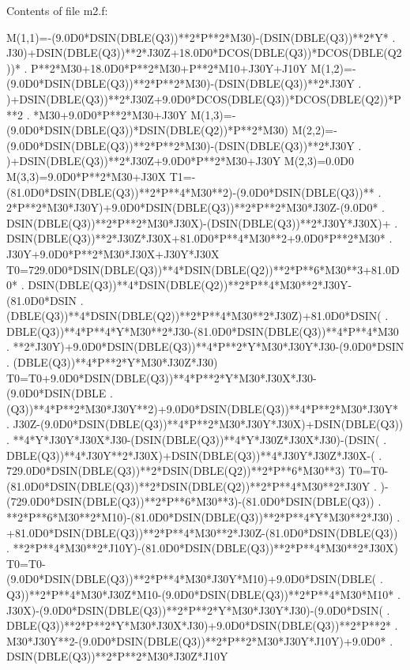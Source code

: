 Contents of file m2.f:
\begin{framedverbatim}
      M(1,1)=-(9.0D0*DSIN(DBLE(Q3))**2*P**2*M30)-(DSIN(DBLE(Q3))**2*Y*
     . J30)+DSIN(DBLE(Q3))**2*J30Z+18.0D0*DCOS(DBLE(Q3))*DCOS(DBLE(Q2))*
     . P**2*M30+18.0D0*P**2*M30+P**2*M10+J30Y+J10Y
      M(1,2)=-(9.0D0*DSIN(DBLE(Q3))**2*P**2*M30)-(DSIN(DBLE(Q3))**2*J30Y
     . )+DSIN(DBLE(Q3))**2*J30Z+9.0D0*DCOS(DBLE(Q3))*DCOS(DBLE(Q2))*P**2
     . *M30+9.0D0*P**2*M30+J30Y
      M(1,3)=-(9.0D0*DSIN(DBLE(Q3))*DSIN(DBLE(Q2))*P**2*M30)
      M(2,2)=-(9.0D0*DSIN(DBLE(Q3))**2*P**2*M30)-(DSIN(DBLE(Q3))**2*J30Y
     . )+DSIN(DBLE(Q3))**2*J30Z+9.0D0*P**2*M30+J30Y
      M(2,3)=0.0D0
      M(3,3)=9.0D0*P**2*M30+J30X
      T1=-(81.0D0*DSIN(DBLE(Q3))**2*P**4*M30**2)-(9.0D0*DSIN(DBLE(Q3))**
     . 2*P**2*M30*J30Y)+9.0D0*DSIN(DBLE(Q3))**2*P**2*M30*J30Z-(9.0D0*
     . DSIN(DBLE(Q3))**2*P**2*M30*J30X)-(DSIN(DBLE(Q3))**2*J30Y*J30X)+
     . DSIN(DBLE(Q3))**2*J30Z*J30X+81.0D0*P**4*M30**2+9.0D0*P**2*M30*
     . J30Y+9.0D0*P**2*M30*J30X+J30Y*J30X
      T0=729.0D0*DSIN(DBLE(Q3))**4*DSIN(DBLE(Q2))**2*P**6*M30**3+81.0D0*
     . DSIN(DBLE(Q3))**4*DSIN(DBLE(Q2))**2*P**4*M30**2*J30Y-(81.0D0*DSIN
     . (DBLE(Q3))**4*DSIN(DBLE(Q2))**2*P**4*M30**2*J30Z)+81.0D0*DSIN(
     . DBLE(Q3))**4*P**4*Y*M30**2*J30-(81.0D0*DSIN(DBLE(Q3))**4*P**4*M30
     . **2*J30Y)+9.0D0*DSIN(DBLE(Q3))**4*P**2*Y*M30*J30Y*J30-(9.0D0*DSIN
     . (DBLE(Q3))**4*P**2*Y*M30*J30Z*J30)
      T0=T0+9.0D0*DSIN(DBLE(Q3))**4*P**2*Y*M30*J30X*J30-(9.0D0*DSIN(DBLE
     . (Q3))**4*P**2*M30*J30Y**2)+9.0D0*DSIN(DBLE(Q3))**4*P**2*M30*J30Y*
     . J30Z-(9.0D0*DSIN(DBLE(Q3))**4*P**2*M30*J30Y*J30X)+DSIN(DBLE(Q3))
     . **4*Y*J30Y*J30X*J30-(DSIN(DBLE(Q3))**4*Y*J30Z*J30X*J30)-(DSIN(
     . DBLE(Q3))**4*J30Y**2*J30X)+DSIN(DBLE(Q3))**4*J30Y*J30Z*J30X-(
     . 729.0D0*DSIN(DBLE(Q3))**2*DSIN(DBLE(Q2))**2*P**6*M30**3)
      T0=T0-(81.0D0*DSIN(DBLE(Q3))**2*DSIN(DBLE(Q2))**2*P**4*M30**2*J30Y
     . )-(729.0D0*DSIN(DBLE(Q3))**2*P**6*M30**3)-(81.0D0*DSIN(DBLE(Q3))
     . **2*P**6*M30**2*M10)-(81.0D0*DSIN(DBLE(Q3))**2*P**4*Y*M30**2*J30)
     . +81.0D0*DSIN(DBLE(Q3))**2*P**4*M30**2*J30Z-(81.0D0*DSIN(DBLE(Q3))
     . **2*P**4*M30**2*J10Y)-(81.0D0*DSIN(DBLE(Q3))**2*P**4*M30**2*J30X)
      T0=T0-(9.0D0*DSIN(DBLE(Q3))**2*P**4*M30*J30Y*M10)+9.0D0*DSIN(DBLE(
     . Q3))**2*P**4*M30*J30Z*M10-(9.0D0*DSIN(DBLE(Q3))**2*P**4*M30*M10*
     . J30X)-(9.0D0*DSIN(DBLE(Q3))**2*P**2*Y*M30*J30Y*J30)-(9.0D0*DSIN(
     . DBLE(Q3))**2*P**2*Y*M30*J30X*J30)+9.0D0*DSIN(DBLE(Q3))**2*P**2*
     . M30*J30Y**2-(9.0D0*DSIN(DBLE(Q3))**2*P**2*M30*J30Y*J10Y)+9.0D0*
     . DSIN(DBLE(Q3))**2*P**2*M30*J30Z*J10Y

\end{framedverbatim}
